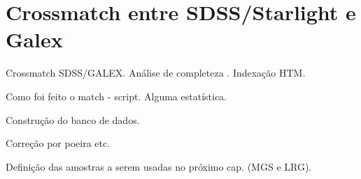 


\chapter{Crossmatch entre SDSS/Starlight e Galex}
\label{sec:Crossmatch}

Crossmatch SDSS/GALEX. Análise de completeza \cite{Budavari2009}. Indexação HTM.

Como foi feito o match - script. Alguma estatística.

Construção do banco de dados.

Correção por poeira etc.

Definição das amostras a serem usadas no próximo cap. (MGS e LRG).



